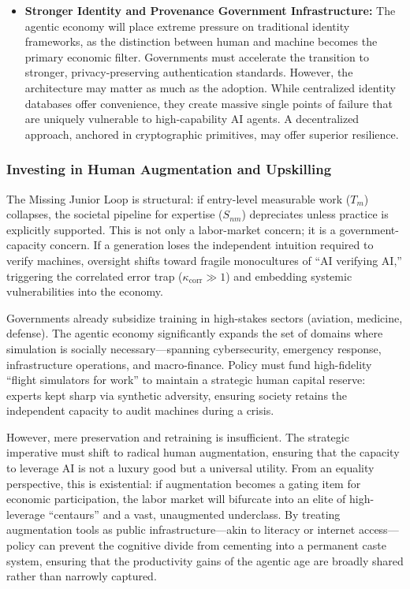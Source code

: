 \documentclass[12pt, letter]{article}
\begin{document}
\begin{itemize}
    \item \textbf{Stronger Identity and Provenance Government Infrastructure:} 
    The agentic economy will place extreme pressure on traditional identity frameworks, as the distinction between human and machine becomes the primary economic filter. Governments must accelerate the transition to stronger, privacy-preserving authentication standards. However, the architecture may matter as much as the adoption. While centralized identity databases offer convenience, they create massive single points of failure that are uniquely vulnerable to high-capability AI agents. A decentralized approach, anchored in cryptographic primitives, may offer superior resilience.
    
\end{itemize}

\subsubsection{Investing in Human Augmentation and Upskilling}
The Missing Junior Loop is structural: if entry-level measurable work ($T_m$) collapses, the societal pipeline for expertise ($S_{nm}$) depreciates unless practice is explicitly supported. This is not only a labor-market concern; it is a government-capacity concern. If a generation loses the independent intuition required to verify machines, oversight shifts toward fragile monocultures of ``AI verifying AI,'' triggering the correlated error trap ($\kappa_{\mathrm{corr}} \gg 1$) and embedding systemic vulnerabilities into the economy.

Governments already subsidize training in high-stakes sectors (aviation, medicine, defense). The agentic economy significantly expands the set of domains where simulation is socially necessary—spanning cybersecurity, emergency response, infrastructure operations, and macro-finance. Policy must fund high-fidelity ``flight simulators for work'' to maintain a strategic human capital reserve: experts kept sharp via synthetic adversity, ensuring society retains the independent capacity to audit machines during a crisis.

However, mere preservation and retraining is insufficient. The strategic imperative must shift to radical human augmentation, ensuring that the capacity to leverage AI is not a luxury good but a universal utility. From an equality perspective, this is existential: if augmentation becomes a gating item for economic participation, the labor market will bifurcate into an elite of high-leverage ``centaurs'' and a vast, unaugmented underclass. By treating augmentation tools as public infrastructure—akin to literacy or internet access—policy can prevent the cognitive divide from cementing into a permanent caste system, ensuring that the productivity gains of the agentic age are broadly shared rather than narrowly captured.
\end{document}
